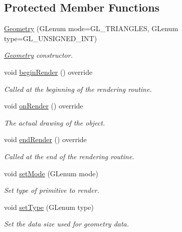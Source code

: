 \subsection*{Protected Member Functions}
\begin{DoxyCompactItemize}
\item 
\mbox{\hyperlink{classec_1_1_geometry_aeae22c6b54c7c534249ee08b3fb77a70}{Geometry}} (G\+Lenum mode=G\+L\+\_\+\+T\+R\+I\+A\+N\+G\+L\+ES, G\+Lenum type=G\+L\+\_\+\+U\+N\+S\+I\+G\+N\+E\+D\+\_\+\+I\+NT)
\begin{DoxyCompactList}\small\item\em \mbox{\hyperlink{classec_1_1_geometry}{Geometry}} constructor. \end{DoxyCompactList}\item 
void \mbox{\hyperlink{classec_1_1_geometry_aeca5f0e52e7c2e4b352ede1a6e7c3f5b}{begin\+Render}} () override
\begin{DoxyCompactList}\small\item\em Called at the beginning of the rendering routine. \end{DoxyCompactList}\item 
void \mbox{\hyperlink{classec_1_1_geometry_a1f166e70fc880e88092f29ef46afb836}{on\+Render}} () override
\begin{DoxyCompactList}\small\item\em The actual drawing of the object. \end{DoxyCompactList}\item 
void \mbox{\hyperlink{classec_1_1_geometry_ae0352702162501df185517e84c3b02bd}{end\+Render}} () override
\begin{DoxyCompactList}\small\item\em Called at the end of the rendering routine. \end{DoxyCompactList}\item 
void \mbox{\hyperlink{classec_1_1_geometry_ad4f80cd4d4c22b108c33b9030e91467b}{set\+Mode}} (G\+Lenum mode)
\begin{DoxyCompactList}\small\item\em Set type of primitive to render. \end{DoxyCompactList}\item 
void \mbox{\hyperlink{classec_1_1_geometry_a12c3da280ff11e86a8b07d18a23e0880}{set\+Type}} (G\+Lenum type)
\begin{DoxyCompactList}\small\item\em Set the data size used for geometry data. \end{DoxyCompactList}\end{DoxyCompactItemize}
